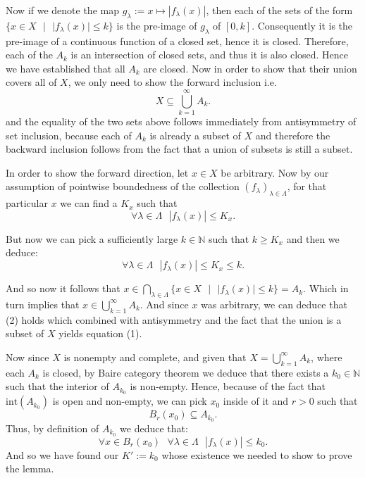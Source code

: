 \documentclass[11pt]{article}
\newcommand\st{\text{ } | \text{ }}
\newcommand\N{\mathbb{N}}
\newcommand\sep{\text{ }}
\begin{document}
 Now if we denote the map $g_\lambda := x \mapsto |f_\lambda(x)| $, then each of the
 sets of the form $\lbrace x \in X \st |f_\lambda(x)| \le k\rbrace$ is the
 pre-image of  $g_\lambda$ of  $[0, k]$. Consequently it is the pre-image of a
 continuous function of a closed set, hence it is closed. Therefore, each of the
 $A_k$ is an intersection of closed sets, and thus it is also closed.
 Hence we have established that all  $A_k$ are closed. Now in order to show that
 their union covers all of  $X$, we only need to show the forward inclusion
 i.e.
 \begin{equation}
    X \subseteq \bigcup_{k = 1}^\infty A_k
  .\end{equation}
 and the equality of the two sets above follows immediately from antisymmetry of set inclusion,
 because each of $A_k$ is already a subset of  $X$ and therefore the backward inclusion follows
 from the fact that a union of subsets is still a subset.

 In order to show the forward direction, let $x \in X$ be arbitrary. Now by our assumption
 of pointwise boundedness of the collection  $\left( f_\lambda \right)_{\lambda \in \Lambda} $,
for that particular $x$ we can find a  $K_x$ such that
$$\forall \lambda \in \Lambda \sep |f_\lambda\left( x \right)| \le K_x. $$

But now we can pick a sufficiently large $k \in \N$ such that  $k \ge K_x$ and then
we deduce:
\[
\forall \lambda \in \Lambda \sep |f_\lambda(x)| \le K_x \le k
.\]

And so now it follows that $x \in \bigcap_{\lambda \in \Lambda}\lbrace x \in X \st
|f_\lambda(x)| \le k \rbrace = A_k$. Which in turn implies that $x \in \bigcup_{k = 1}^\infty A_k$.
And since  $x$ was arbitrary, we can deduce that (2) holds which combined with
antisymmetry and the fact that the union is a subset of $X$ yields equation (1).

Now since $X$ is nonempty and complete, and given that  $X = \bigcup_{k = 1}^\infty A_k$, where
each  $A_k$ is closed, by Baire category theorem we deduce that there exists a
$k_0 \in \N$ such that the interior of  $A_{k_0}$ is non-empty.
Hence, because of the fact that $\text{int}(A_{k_0})$ is open and non-empty, we can pick
$x_0$ inside of it and  $r > 0$ such that
 \[
   B_r(x_0) \subseteq A_{k_0}
.\]
Thus, by definition of $A_{k_0}$ we deduce that:
 \[
 \forall x \in B_r(x_0) \sep \forall \lambda \in \Lambda \sep |f_\lambda(x)| \le k_0
.\]
And so we have found our $K' := k_0$ whose existence we needed to show to prove
the lemma. \hfill \blacksquare
\end{document}
